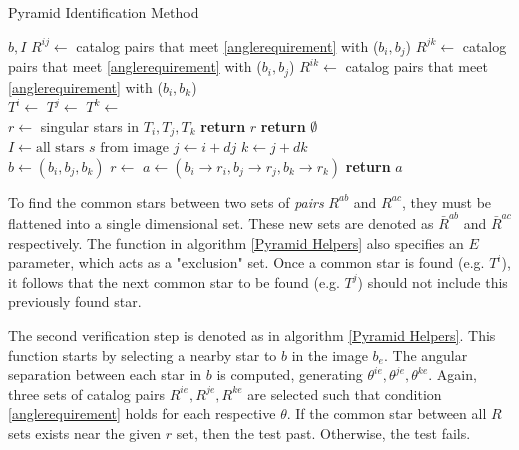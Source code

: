 \begin{algorithm}
\caption{Pyramid Identification Method}
\label{Pyramid Star Identification}
\begin{algorithmic}[1]
 {$b, I$}
\State $R^{ij} \gets$ catalog pairs that meet \eqref{anglerequirement} with ($b_i, b_j$)
\State $R^{jk} \gets$ catalog pairs that meet \eqref{anglerequirement} with ($b_i, b_j$)
\State $R^{ik} \gets$ catalog pairs that meet \eqref{anglerequirement} with ($b_i, b_k$)
\\ 
\State $T^i \gets $ 
\State $T^j \gets $ 
\State $T^k \gets $ 
\\
\State $r \gets $ singular stars in $T_i, T_j, T_k$ 
\State \textbf{return} $r$
\Else
\State \textbf{return} $\emptyset$
\EndIf
\EndIf
\EndFunction
\\
\State $I \gets \text{all stars } s \text{ from image}$
\State $j \gets i + dj$
\State $k \gets j + dk$
\\
\State $b \gets (b_i, b_j, b_k)$
\State $r \gets$ 
\State $a \gets (b_i \rightarrow r_i, b_j \rightarrow r_j, b_k \rightarrow r_k)$
\State \textbf{return} $a$
\EndIf
\EndFor
\EndFor
\EndFor
\EndProcedure
\end{algorithmic}
\end{algorithm}

To find the common stars between two sets of \textit{pairs} $R^{ab}$ and $R^{ac}$, they must be flattened into a single dimensional set. These new sets are denoted as $\bar{R}^{ab}$ and $\bar{R}^{ac}$ respectively. The function  in algorithm \eqref{Pyramid Helpers} also specifies an $E$ parameter, which acts as a "exclusion" set. Once a common star is found (e.g. $T^i$), it follows that the next common star to be found (e.g. $T^j$) should not include this previously found star. 

The second verification step is denoted as  in algorithm \eqref{Pyramid Helpers}. This function starts by selecting a nearby star to $b$ in the image $b_e$. The angular separation between each star in $b$ is computed, generating $\theta^{ie}, \theta^{je}, \theta^{ke}$. Again, three sets of catalog pairs $R^{ie}, R^{je}, R^{ke}$ are selected such that condition \eqref{anglerequirement} holds for each respective $\theta$. If the common star between all $R$ sets exists near the given $r$ set, then the test past. Otherwise, the test fails.

